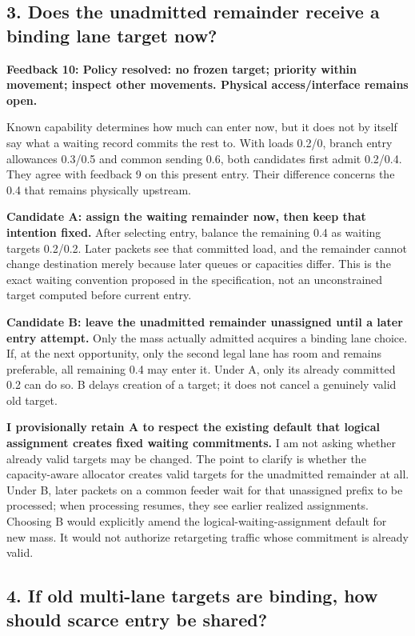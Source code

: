 \documentclass[11pt,a4paper]{article}
\begin{document}
\subsection*{3. Does the unadmitted remainder receive a binding lane target now?}

\textbf{Feedback 10: Policy resolved: no frozen target; priority within movement; inspect other movements. Physical access/interface remains open.}

Known capability determines how much can enter now, but it does not by itself say what a waiting record commits the rest to. With loads 0.2/0, branch entry allowances 0.3/0.5 and common sending 0.6, both candidates first admit 0.2/0.4. They agree with feedback 9 on this present entry. Their difference concerns the 0.4 that remains physically upstream.

\textbf{Candidate A: assign the waiting remainder now, then keep that intention fixed.} After selecting entry, balance the remaining 0.4 as waiting targets 0.2/0.2. Later packets see that committed load, and the remainder cannot change destination merely because later queues or capacities differ. This is the exact waiting convention proposed in the specification, not an unconstrained target computed before current entry.

\textbf{Candidate B: leave the unadmitted remainder unassigned until a later entry attempt.} Only the mass actually admitted acquires a binding lane choice. If, at the next opportunity, only the second legal lane has room and remains preferable, all remaining 0.4 may enter it. Under A, only its already committed 0.2 can do so. B delays creation of a target; it does not cancel a genuinely valid old target.

\textbf{I provisionally retain A to respect the existing default that logical assignment creates fixed waiting commitments.} I am not asking whether already valid targets may be changed. The point to clarify is whether the capacity-aware allocator creates valid targets for the unadmitted remainder at all. Under B, later packets on a common feeder wait for that unassigned prefix to be processed; when processing resumes, they see earlier realized assignments. Choosing B would explicitly amend the logical-waiting-assignment default for new mass. It would not authorize retargeting traffic whose commitment is already valid.

\subsection*{4. If old multi-lane targets are binding, how should scarce entry be shared?}
\end{document}
